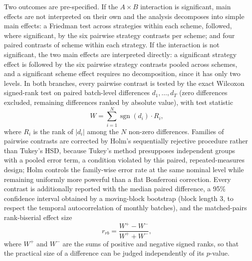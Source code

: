 Two outcomes are pre-specified. If the $A \times B$ interaction is significant, main effects are not interpreted on their own and the analysis decomposes into simple main effects: a Friedman test across strategies within each scheme, followed, where significant, by the six pairwise strategy contrasts per scheme; and four paired contrasts of scheme within each strategy. If the interaction is not significant, the two main effects are interpreted directly: a significant strategy effect is followed by the six pairwise strategy contrasts pooled across schemes, and a significant scheme effect requires no decomposition, since it has only two levels. In both branches, every pairwise contrast is tested by the exact Wilcoxon signed-rank test \cite{demsar2006} on paired batch-level differences $d_1, \ldots, d_T$ (zero differences excluded, remaining differences ranked by absolute value), with test statistic
\begin{equation}
  W = \sum_{i=1}^{N} \operatorname{sgn}(d_i) \cdot R_i,
  \label{eq:wilcoxon}
\end{equation}
where $R_i$ is the rank of $|d_i|$ among the $N$ non-zero differences. Families of pairwise contrasts are corrected by Holm's sequentially rejective procedure rather than Tukey's HSD, because Tukey's method presupposes independent groups with a pooled error term, a condition violated by this paired, repeated-measures design; Holm controls the family-wise error rate at the same nominal level while remaining uniformly more powerful than a flat Bonferroni correction. Every contrast is additionally reported with the median paired difference, a 95\% confidence interval obtained by a moving-block bootstrap (block length 3, to respect the temporal autocorrelation of monthly batches), and the matched-pairs rank-biserial effect size
\begin{equation}
  r_{rb} = \frac{W^{+} - W^{-}}{W^{+} + W^{-}},
  \label{eq:rank-biserial}
\end{equation}
where $W^{+}$ and $W^{-}$ are the sums of positive and negative signed ranks, so that the practical size of a difference can be judged independently of its $p$-value.

